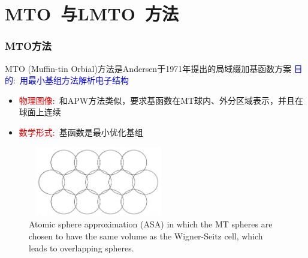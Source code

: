 \section{\rm{MTO~}与\rm{LMTO~}方法}
\frame
{
\frametitle{\textrm{MTO}方法}
\textrm{MTO (Muffin-tin Orbial)}方法是\textrm{Andersen}于\textrm{1971}年提出的局域缀加基函数方案
\vskip 5pt
\textcolor{blue}{目的:~用最小基组方法解析电子结构}
\begin{itemize}
	\item \textcolor{red}{物理图像}:~和\textrm{APW}方法类似，要求基函数在\textrm{MT}球内、外分区域表示，并且在球面上连续
	\item \textcolor{red}{数学形式}:~基函数是最小优化基组
\end{itemize}
\begin{figure}[h!]
	\vspace{-5pt}
\centering
\includegraphics[height=1.20in,width=2.42in,viewport=5 0 1005 495,clip]{Figures/Atomic_sphere-appro.png}
\caption{\fontsize{6.2pt}{4.2pt}\selectfont\textrm{Atomic sphere approximation (ASA) in which the MT spheres are chosen to have the same volume as the Wigner-Seitz cell, which leads to overlapping spheres.}}
\label{Atomic_sphere-appro}
\end{figure}
}

